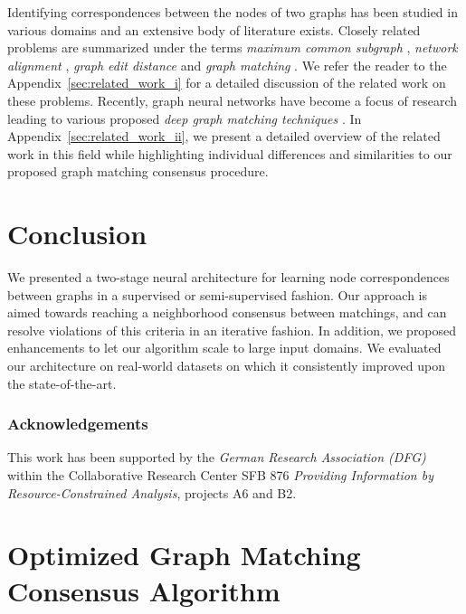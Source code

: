 \documentclass{article}
\begin{document}
Identifying correspondences between the nodes of two graphs has been studied in various domains and an extensive body of literature exists.
Closely related problems are summarized under the terms \emph{maximum common subgraph} \citep{Kriege/etal/2019}, \emph{network alignment} \citep{Zhang/Tong/2016}, \emph{graph edit distance} \citep{Chen/etal/2019} and \emph{graph matching} \citep{Yan/etal/2016}.
We refer the reader to the Appendix~\ref{sec:related_work_i} for a detailed discussion of the related work on these problems.
Recently, graph neural networks have become a focus of research leading to various proposed \emph{deep graph matching techniques} \citep{Wang/etal/2019,Zhang/Lee/2019,Xu/etal/2019a,Derr/etal/2019}.
In Appendix~\ref{sec:related_work_ii}, we present a detailed overview of the related work in this field while highlighting individual differences and similarities to our proposed graph matching consensus procedure.

\section{Conclusion}\label{sec:conclusion}

We presented a two-stage neural architecture for learning node correspondences between graphs in a supervised or semi-supervised fashion.
Our approach is aimed towards reaching a neighborhood consensus between matchings, and can resolve violations of this criteria in an iterative fashion.
In addition, we proposed enhancements to let our algorithm scale to large input domains.
We evaluated our architecture on real-world datasets on which it consistently improved upon the state-of-the-art.

\subsubsection*{Acknowledgements}

This work has been supported by the \emph{German Research Association (DFG)} within the Collaborative Research Center SFB 876 \emph{Providing Information by Resource-Constrained Analysis}, projects A6 and B2.




\newpage

\appendix

\section{Optimized Graph Matching Consensus Algorithm}\label{sec:optimized_graph_matching_consensus_algorithm}
\end{document}
